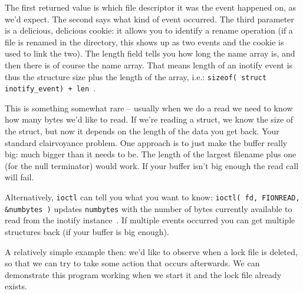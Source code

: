 The first returned value is which file descriptor it was the event happened on, as we'd expect. The second says what kind of event occurred. The third parameter is a delicious, delicious cookie: it allows you to identify a rename operation (if a file is renamed in the directory, this shows up as two events and the cookie is used to link the two). The length field tells you how long the name array is, and then there is of course the name array. That means length of an inotify event is thus the structure size plus the length of the array, i.e.: \texttt{sizeof( struct inotify\_event) + len}~\cite{lpi}.

This is something somewhat rare -- usually when we do a read we need to know how many bytes we'd like to read. If we're reading a struct, we know the size of the struct, but now it depends on the length of the data you get back. Your standard clairvoyance problem. One approach is to just make the buffer really big: much bigger than it needs to be. The length of the largest filename plus one (for the null terminator) would work. If your buffer isn't big enough the read call will fail.

Alternatively, \texttt{ioctl} can tell you what you want to know: \texttt{ioctl( fd, FIONREAD, \&numbytes )} updates \texttt{numbytes} with the number of bytes currently available to read from the inotify instance~\cite{lpi}.  If multiple events occurred you can get multiple structures back (if your buffer is big enough).

A relatively simple example then: we'd like to observe when a lock file is deleted, so that we can try to take some action that occurs afterwards. We can demonstrate this program working when we start it and the lock file already exists.

